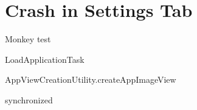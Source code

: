
\section{Crash in Settings Tab}
\label{sec:crash_in_settings_tab}

Monkey test

LoadApplicationTask

AppViewCreationUtility.createAppImageView

synchronized